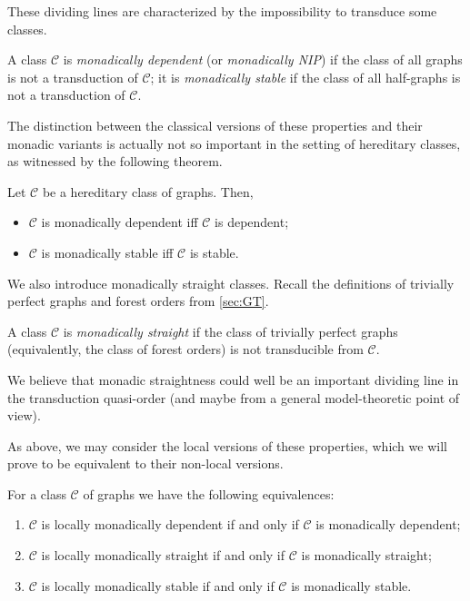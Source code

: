 \documentclass{lmcs}
\newcommand{\Cc}{\mathscr{C}}
\theoremstyle{definition}
\begin{document}
These dividing lines are characterized by the impossibility to transduce some classes.

\begin{thmC}
	\label{thm:BS}
	A class $\Cc$ is \emph{monadically dependent} (or \emph{monadically NIP}) if the class of all graphs is not a transduction of $\Cc$; it is \emph{monadically stable} if the class of all half-graphs is not a transduction of $\Cc$.
\end{thmC}




The distinction between the classical versions of these properties and their monadic variants is actually not so important in the setting of hereditary classes, as witnessed by the following theorem.

\begin{thmC}
	Let $\Cc$ be a hereditary class of graphs. Then,
	\begin{itemize}
		\item $\Cc$ is monadically dependent iff $\Cc$ is dependent;
		\item $\Cc$ is monadically stable iff $\Cc$ is stable.
	\end{itemize}
\end{thmC}

We also introduce monadically straight classes. Recall the definitions of trivially perfect graphs and forest orders from \cref{sec:GT}.

\begin{defi}
	A class $\Cc$ is {\em monadically straight} if the class of trivially perfect graphs (equivalently, the class of forest orders) is not transducible from $\Cc$.
	\end{defi}

 We believe that monadic straightness could well be an important dividing line in the transduction quasi-order (and maybe from a general model-theoretic point of view).

\pagebreak
As above, we may consider the local versions of these properties, which we will prove to be equivalent to their non-local versions.

\begin{thm}
\label{thm:local}
For a class $\Cc$ of graphs we have the following equivalences:
\begin{enumerate}
\item $\Cc$ is locally monadically dependent if and only if $\Cc$ is
  monadically dependent;
\item $\Cc$ is locally monadically straight if and only if $\Cc$ is
  monadically straight;
\item $\Cc$ is locally monadically stable if and only if $\Cc$ is
  monadically stable.
\end{enumerate}
\end{thm}
\end{document}
